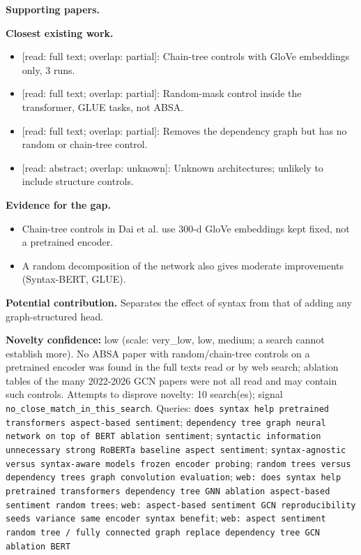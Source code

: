 \documentclass[11pt,a4paper]{article}
\begin{document}
\textbf{Supporting papers.} \cite{dai2021syntax,bai2021syntaxbert,xiao2021bert4gcn}

\textbf{Closest existing work.}
\begin{itemize}
\item \cite{dai2021syntax} [read: full text; overlap: partial]: Chain-tree controls with GloVe embeddings only, 3 runs.
\item \cite{bai2021syntaxbert} [read: full text; overlap: partial]: Random-mask control inside the transformer, GLUE tasks, not ABSA.
\item \cite{xiao2021bert4gcn} [read: full text; overlap: partial]: Removes the dependency graph but has no random or chain-tree control.
\item \cite{lebmeier2023repro} [read: abstract; overlap: unknown]: Unknown architectures; unlikely to include structure controls.
\end{itemize}

\textbf{Evidence for the gap.}
\begin{itemize}
\item [V] Chain-tree controls in Dai et al. use 300-d GloVe embeddings kept fixed, not a pretrained encoder. \cite{dai2021syntax}
\item [V] A random decomposition of the network also gives moderate improvements (Syntax-BERT, GLUE). \cite{bai2021syntaxbert}
\end{itemize}

\textbf{Potential contribution.} Separates the effect of syntax from that of adding any graph-structured head.

\textbf{Novelty confidence:} low (scale: very\_low, low, medium; a search cannot establish more). No ABSA paper with random/chain-tree controls on a pretrained encoder was found in the full texts read or by web search; ablation tables of the many 2022-2026 GCN papers were not all read and may contain such controls.
Attempts to disprove novelty: 10 search(es); signal \texttt{no\_close\_match\_in\_this\_search}. Queries: \texttt{does syntax help pretrained transformers aspect-based sentiment}; \texttt{dependency tree graph neural network on top of BERT ablation sentiment}; \texttt{syntactic information unnecessary strong RoBERTa baseline aspect sentiment}; \texttt{syntax-agnostic versus syntax-aware models frozen encoder probing}; \texttt{random trees versus dependency trees graph convolution evaluation}; \texttt{web: does syntax help pretrained transformers dependency tree GNN ablation aspect-based sentiment random trees}; \texttt{web: aspect-based sentiment GCN reproducibility seeds variance same encoder syntax benefit}; \texttt{web: aspect sentiment random tree / fully connected graph replace dependency tree GCN ablation BERT}
\end{document}
